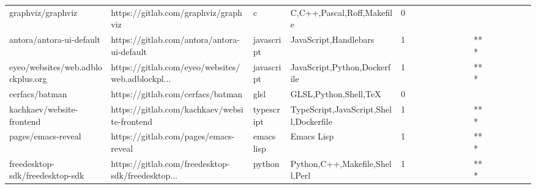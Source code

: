 \begin{tabular}{llllrlllllllllllll}
graphviz/graphviz                                  &               https://gitlab.com/graphviz/graphviz &                 c &                         C,C++,Pascal,Roff,Makefile &       0 &         &        &           &                &                 &        &           &           &          &          &       &              &          \\
antora/antora-ui-default                           &        https://gitlab.com/antora/antora-ui-default &        javascript &                              JavaScript,Handlebars &       1 &         &        &           &                &                 &        &           &       *** &          &          &       &              &          \\
eyeo/websites/web.adblockplus.org                  &  https://gitlab.com/eyeo/websites/web.adblockpl... &        javascript &                       JavaScript,Python,Dockerfile &       1 &         &        &           &                &                 &        &           &       *** &          &          &       &              &          \\
cerfacs/batman                                     &                  https://gitlab.com/cerfacs/batman &              glsl &                              GLSL,Python,Shell,TeX &       0 &         &        &           &                &                 &        &           &           &          &          &       &              &          \\
kachkaev/website-frontend                          &       https://gitlab.com/kachkaev/website-frontend &        typescript &             TypeScript,JavaScript,Shell,Dockerfile &       1 &         &        &           &                &                 &        &           &       *** &          &          &       &              &          \\
pages/emacs-reveal                                 &              https://gitlab.com/pages/emacs-reveal &        emacs lisp &                                         Emacs Lisp &       1 &         &        &           &                &                 &        &           &       *** &          &          &       &              &          \\
freedesktop-sdk/freedesktop-sdk                    &  https://gitlab.com/freedesktop-sdk/freedesktop... &            python &                     Python,C++,Makefile,Shell,Perl &       1 &         &        &           &                &                 &        &           &       *** &          &          &       &              &          \\

\end{tabular}
